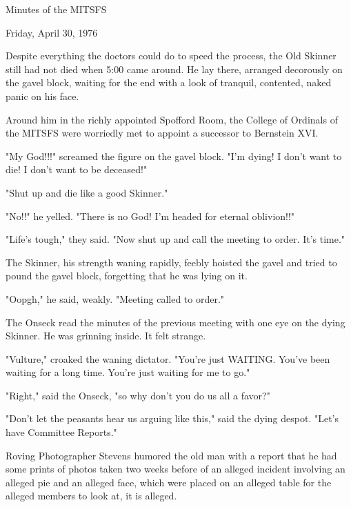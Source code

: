 \documentclass[12pt]{article}
\begin{document}
\begin{center}

Minutes of the MITSFS

Friday, April 30, 1976

\end{center}
 
\vspace{12pt}

\setlength{\parskip}{6pt}

\noindent
Despite everything the doctors could do to speed the process, the Old Skinner still had not died when 5:00 came around. He lay there, arranged decorously on the gavel block, waiting for the end with a look of tranquil, contented, naked panic on his face.

Around him in the richly appointed Spofford Room, the College of Ordinals of the MITSFS were worriedly met to appoint a successor to Bernstein XVI.

"My God!!!" screamed the figure on the gavel block. "I'm dying! I don't want to die! I don't want to be deceased!"

"Shut up and die like a good Skinner."

"No!!" he yelled. "There is no God! I'm headed for eternal oblivion!!"

"Life's tough," they said. "Now shut up and call the meeting to order. It's time."

The Skinner, his strength waning rapidly, feebly hoisted the gavel and tried to pound the gavel block, forgetting that he was lying on it.

"Oopgh," he said, weakly. "Meeting called to order."

The Onseck read the minutes of the previous meeting with one eye on the dying Skinner. He was grinning inside. It felt strange.

"Vulture," croaked the waning dictator. "You're just WAITING. You've been waiting for a long time. You're just waiting for me to go."

"Right," said the Onseck, "so why don't you do us all a favor?"

"Don't let the peasants hear us arguing like this," said the dying despot. "Let's have Committee Reports."

Roving Photographer Stevens humored the old man with a report that he had some prints of photos taken two weeks before of an alleged incident involving an alleged pie and an alleged face, which were placed on an alleged table for the alleged members to look at, it is alleged.
\end{document}
